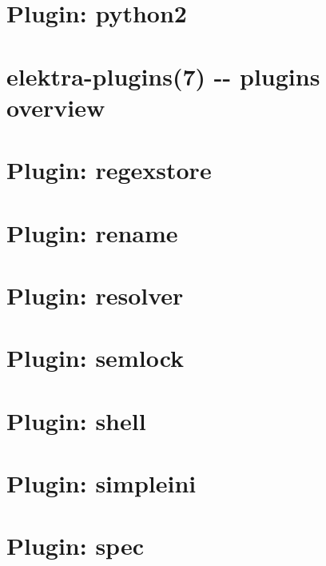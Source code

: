 \documentclass[twoside]{book}
\newcommand{\+}{\discretionary{\mbox{\scriptsize$\hookleftarrow$}}{}{}}
\begin{document}
\chapter{Plugin\+: python2}
\label{md_src_plugins_python2_README}
\hypertarget{md_src_plugins_python2_README}{}

\chapter{elektra-\/plugins(7) -\/-\/ plugins overview}
\label{md_src_plugins_README}
\hypertarget{md_src_plugins_README}{}

\chapter{Plugin\+: regexstore}
\label{md_src_plugins_regexstore_README}
\hypertarget{md_src_plugins_regexstore_README}{}

\chapter{Plugin\+: rename}
\label{md_src_plugins_rename_README}
\hypertarget{md_src_plugins_rename_README}{}

\chapter{Plugin\+: resolver}
\label{md_src_plugins_resolver_README}
\hypertarget{md_src_plugins_resolver_README}{}

\chapter{Plugin\+: semlock}
\label{md_src_plugins_semlock_README}
\hypertarget{md_src_plugins_semlock_README}{}

\chapter{Plugin\+: shell}
\label{md_src_plugins_shell_README}
\hypertarget{md_src_plugins_shell_README}{}

\chapter{Plugin\+: simpleini}
\label{md_src_plugins_simpleini_README}
\hypertarget{md_src_plugins_simpleini_README}{}

\chapter{Plugin\+: spec}
\label{md_src_plugins_spec_README}
\hypertarget{md_src_plugins_spec_README}{}

\end{document}
